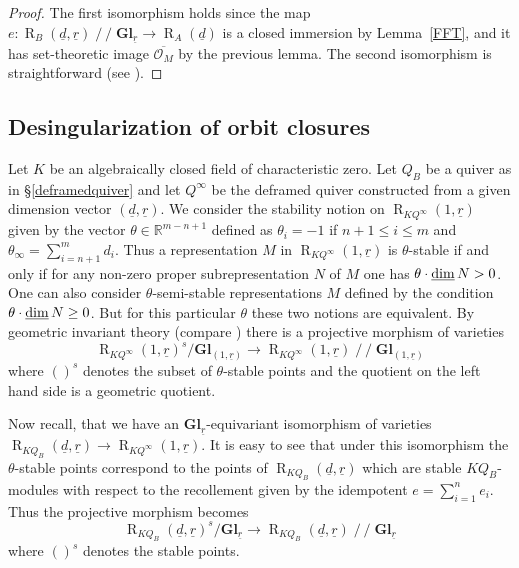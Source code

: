 \documentclass[11pt,a4paper]{amsart}
\theoremstyle{plain}
\theoremstyle{definition}
\begin{document}
\begin{proof}
The first isomorphism holds since the map
${e} \colon {\operatorname{R}_B(\underline{d},\underline{r})} \operatorname{/\!\!/} {\mathbf{Gl}_{\underline{r}}} \to {\operatorname{R}_A(\underline{d})}$ is a closed immersion
by Lemma~\ref{FFT}, and it has set-theoretic image 
$\overline{{\mathcal{O}}_M}$ by the previous lemma. 
The second isomorphism is straightforward (see \cite[Theorem 3.3]{CFR}).
\end{proof}

\subsection*{Desingularization of orbit closures}
 
 
 
Let $K$ be an algebraically closed field of characteristic zero. 
Let $Q_B$ be a quiver as in \S\ref{deframedquiver} and let $Q^\infty$ be the deframed 
quiver constructed from a given dimension vector $({\underline{d}}, {\underline{r}})$. 
We consider the stability notion on ${\operatorname{R}_{KQ^{\infty}}(1,\underline{r})} $ given by the vector $\theta \in {\mathbb{R}}^{m-n+1}$ defined as $\theta_i = -1 $ if $n+1\leq i\leq m$ and $\theta_{\infty} = \sum_{i=n+1}^m d_i$. 
Thus a representation $M$ in ${\operatorname{R}_{KQ^{\infty}}(1,\underline{r})} $ is $\theta$-stable if and only if for any non-zero proper subrepresentation $N$ of $M$ one has $\theta \cdot \operatorname{\rm \underline{dim}} N > 0$. One can also consider $\theta$-semi-stable representations $M$ defined by the condition $\theta \cdot \operatorname{\rm \underline{dim}} N \geq 0$. But for this particular $\theta$ these two notions are equivalent. 
By geometric invariant theory (compare \cite{Ki}) there is a projective morphism of varieties 
\[ 
{\operatorname{R}_{KQ^{\infty}}(1,\underline{r})}^{s} / {\mathbf{Gl}}_{(1, {\underline{r}} ) } \to {\operatorname{R}_{KQ^{\infty}}(1,\underline{r})} \operatorname{/\!\!/} {\mathbf{Gl}}_{(1, {\underline{r}} )} 
\]
where $()^{s}$ denotes the subset of $\theta$-stable points and the quotient on the left hand side is a geometric quotient. 

Now recall, that we have an ${\mathbf{Gl}_{\underline{r}}}$-equivariant isomorphism of varieties  
${\operatorname{R}_{KQ_B}(\underline{d},\underline{r})} \to {\operatorname{R}_{KQ^{\infty}}(1,\underline{r})}$. It is easy to see that under this isomorphism the $\theta$-stable points correspond to the points of ${\operatorname{R}_{KQ_B}(\underline{d},\underline{r})}$ which are stable $KQ_B$-modules with respect to the recollement given by the idempotent $e=\sum_{i=1}^n e_i$.  
Thus the projective morphism becomes 
\[ 
{\operatorname{R}_{KQ_B}(\underline{d},\underline{r})}^{s} / {\mathbf{Gl}_{\underline{r}}} \to {\operatorname{R}_{KQ_B}(\underline{d},\underline{r})} \operatorname{/\!\!/} {\mathbf{Gl}_{\underline{r}}} 
\]
where $()^{s}$ denotes the stable points. 
\end{document}
